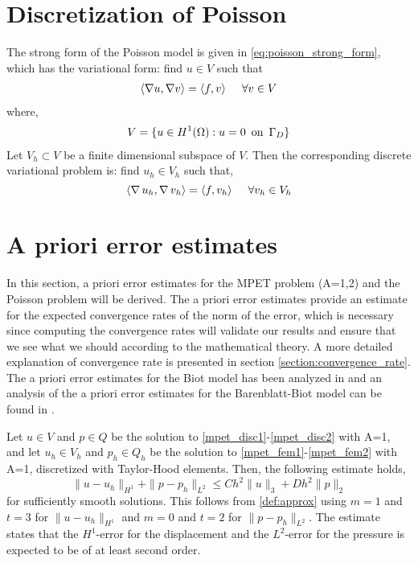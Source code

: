 \section{Discretization of Poisson} \label{disc_poisson}
The strong form of the Poisson model is given in \eqref{eq:poisson_strong_form}, which has the variational form: find $u \in V$ such that
\begin{align} \label{poisson_disc}
\langle \nabla u , \nabla v  \rangle = \langle f, v  \rangle \hspace{0.5cm} \forall v \in V
\end{align}
where,
\begin{align}
V = \{u \in H^1(\Omega) : u = 0 \,\,\, \textnormal{on} \,\,\, \Gamma_D \}
\end{align}
Let $V_h \subset V$ be a finite dimensional subspace of $V$. Then the corresponding discrete variational problem is: find $u_h \in V_h$ such that,
\begin{equation} \label{eq:poisson_variational}
\langle \nabla \, u_h, \nabla \, v_h \rangle = \langle f, v_h  \rangle \hspace{0.5cm} \forall v_h \in V_h
\end{equation}
\section{A priori error estimates} \label{section:a_priori}
In this section, a priori error estimates for the MPET problem (A=1,2) and the Poisson problem will be derived. The a priori error estimates provide an estimate for the expected convergence rates of the norm of the error, which is necessary since computing the convergence rates will validate our results and ensure that we see what we should according to the mathematical theory. A more detailed explanation of convergence rate is presented in section \ref{section:convergence_rate}. The a priori error estimates for the Biot model has been analyzed in \cite{meunier} and an analysis of the a priori error estimates for the Barenblatt-Biot model can be found in \cite{boal}.
\\
\begin{definition}[\textbf{A priori error estimate (MPET, A=1)}]
Let $u\in V$ and $p \in Q$ be the solution to \eqref{mpet_disc1}-\eqref{mpet_disc2} with A=1, and let $u_h \in V_h$ and $p_h \in Q_h$ be the solution to \eqref{mpet_fem1}-\eqref{mpet_fem2} with A=1, discretized with Taylor-Hood elements. Then, the following estimate holds,
\begin{equation*}
\|u - u_h \|_{H^1} + \|p - p_h \|_{L^2} \leq Ch^2\|u \|_3 + Dh^2\|p \|_2
\end{equation*}
for sufficiently smooth solutions. This follows from \eqref{def:approx} using $m=1$ and $t=3$ for $\|u - u_h \|_{H^1}$ and $m=0$ and $t=2$ for $\|p - p_h \|_{L^2}$. The estimate states that the $H^1$-error for the displacement and the $L^2$-error for the pressure is expected to be of at least second order. 
\end{definition}

